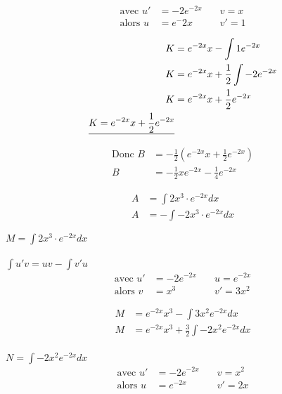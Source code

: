 \begin{align*}
	\text{avec } u' &= -2e^{-2x} \quad &v= x \\
	\text{alors } u &= e^-{2x} \quad &v'= 1
\end{align*}

\begin{align*}
	K &= e^{-2x}x - \int 1e^{-2x} \\
	K &= e^{-2x}x + \frac{1}{2} \int -2e^{-2x} \\
	K &= e^{-2x}x + \frac{1}{2} e^{-2x} \\
	\text{\underline{$K = e^{-2x}x + \frac{1}{2} e^{-2x}$}}
\end{align*}

\begin{align*}
	\text{Donc } B &= -\frac{1}{2}(e^{-2x}x + \frac{1}{2} e^{-2x}) \\
	B &= -\frac{1}{2} x e^{-2x} - \frac{1}{4} e^{-2x}
\end{align*}

\vspace{0.5cm}
\begin{align*}
	A &= \int 2x^3 \cdot e^{-2x} dx \\
	A &= - \int - 2x^3 \cdot e^{-2x} dx
\end{align*}

 $M = \int 2x^3 \cdot e^{-2x} dx$ \\
 \\
$\int u'v = uv - \int v'u$ \\
\begin{align*}
	\text{avec } u' &= -2e^{-2x} \quad &u= e^{-2x} \\
	\text{alors } v &= x^3 \quad &v'= 3x^2
\end{align*}

\begin{align*}
	M &= e^{-2x}x^3 - \int 3x^2e^{-2x} dx \\
	M &= e^{-2x}x^3 + \frac{3}{2}\int -2 x^2e^{-2x} dx \\
\end{align*}

 $N = \int -2 x^2e^{-2x} dx$ \\
\begin{align*}
	\text{avec } u' &= -2e^{-2x} \quad &v= x^{2} \\
	\text{alors } u &= e^{-2x} \quad &v'= 2x
\end{align*}

